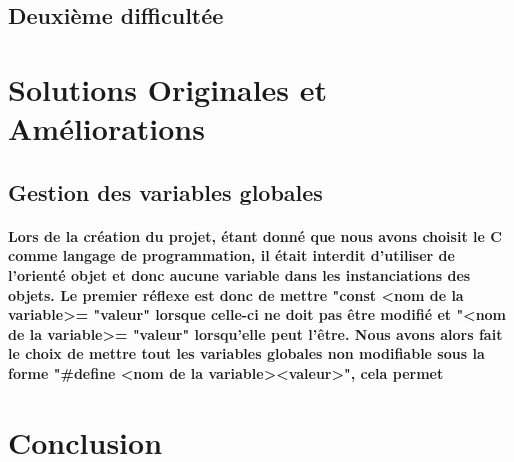 \documentclass[utf8]{article}
\begin{document}
\subsection{Deuxième difficultée}
\paragraph{}

\section{Solutions Originales et Améliorations}
\subsection{Gestion des variables globales}
\paragraph{Lors de la création du projet, étant donné que nous avons choisit le C comme langage de programmation, il était interdit 
d'utiliser de l'orienté objet et donc aucune variable dans les instanciations des objets. Le premier réflexe est donc de mettre
"const \textless nom de la variable\textgreater  = "valeur" lorsque celle-ci ne doit pas être modifié et "\textless nom de la variable\textgreater = "valeur" lorsqu'elle 
peut l'être. Nous avons alors fait le choix de mettre tout les variables globales non modifiable sous la forme 
"\#define \textless nom de la variable\textgreater \textless valeur\textgreater", cela permet }

\section{Conclusion}
\paragraph{}
\end{document}
